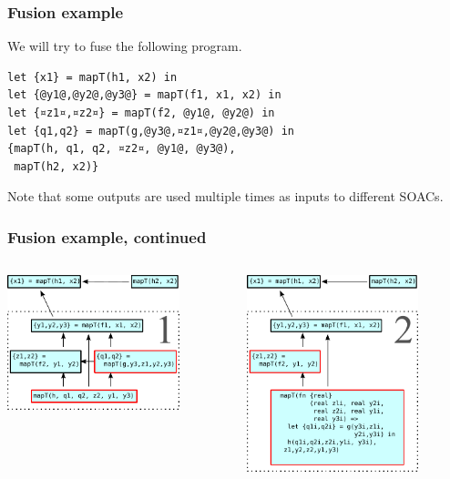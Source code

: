 \documentclass{beamer}
\begin{document}
\begin{frame}[fragile]
  \frametitle{Fusion example}

  We will try to fuse the following program.

\begin{lstlisting}
let {x1} = mapT(h1, x2) in
let {@y1@,@y2@,@y3@} = mapT(f1, x1, x2) in
let {¤z1¤,¤z2¤} = mapT(f2, @y1@, @y2@) in
let {q1,q2} = mapT(g,@y3@,¤z1¤,@y2@,@y3@) in
{mapT(h, q1, q2, ¤z2¤, @y1@, @y3@),
 mapT(h2, x2)}
\end{lstlisting}

  Note that some outputs are used multiple times as inputs to different
  SOACs.

\end{frame}

\begin{frame}[t]
  \frametitle{Fusion example, continued}

  \centering
  \begin{columns}
    \begin{column}[T]{0.48\textwidth}
      \includegraphics[width=5cm]{img/fusion-1.pdf}
    \end{column}\hfill
    \begin{column}[T]{0.48\textwidth}
      \includegraphics[width=5cm]{img/fusion-2.pdf}
    \end{column}
  \end{columns}

\end{frame}
\end{document}
